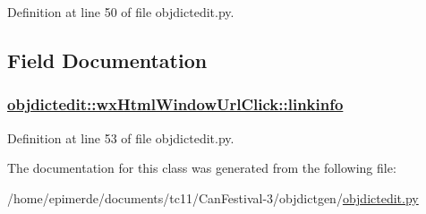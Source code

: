 Definition at line 50 of file objdictedit.py.

\subsection{Field Documentation}
\hypertarget{classobjdictedit_1_1wxHtmlWindowUrlClick_6a78aa98e9dcf8a31aa79b429998cf46}{
\subsubsection[linkinfo]{\setlength{\rightskip}{0pt plus 5cm}\hyperlink{classobjdictedit_1_1wxHtmlWindowUrlClick_6a78aa98e9dcf8a31aa79b429998cf46}{objdictedit::wx\-Html\-Window\-Url\-Click::linkinfo}}}
\label{classobjdictedit_1_1wxHtmlWindowUrlClick_6a78aa98e9dcf8a31aa79b429998cf46}




Definition at line 53 of file objdictedit.py.

The documentation for this class was generated from the following file:\begin{CompactItemize}
\item 
/home/epimerde/documents/tc11/Can\-Festival-3/objdictgen/\hyperlink{objdictedit_8py}{objdictedit.py}\end{CompactItemize}

